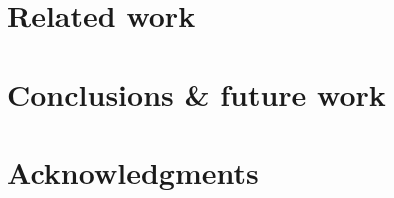 \documentclass{www2003-submission}
\begin{document}
\section{Related work}


\section{Conclusions \& future work}


\section{Acknowledgments}



%
\appendix
\end{document}
